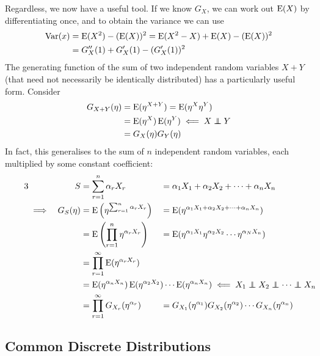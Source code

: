 Regardless, we now have a useful tool. If we know \(G_X\), we can work out
\(\operatorname{E}(X)\) by differentiating once, and to obtain the variance we can use
\begin{align*}
\operatorname{Var}(x) &= \operatorname{E}(X^2) - (\operatorname{E}(X))^2
    = \operatorname{E}(X^2 - X) + \operatorname{E}(X) - (\operatorname{E}(X))^2 \\
    &= G_X''(1) + G_X'(1) - (G_X'(1))^2
\end{align*}
The generating function of the sum of two independent random variables \(X + Y\)
(that need not necessarily be identically distributed) has a particularly useful
form. Consider
\begin{align*}
G_{X+Y}(\eta) &= \Expect(\eta^{X + Y}) = \Expect(\eta^X \eta^Y) \\
    &= \Expect(\eta^X) \Expect(\eta^Y) \impliedby X \independent Y \\
    &= G_X(\eta) G_Y(\eta)
\end{align*}
In fact, this generalises to the sum of \(n\) independent random variables, each
multiplied by some constant coefficient:
\begin{alignat*} 3
&& S &= \sum_{r = 1}^n \alpha_r X_r
    &&= \alpha_1 X_1 + \alpha_2 X_2 + \dotsb + \alpha_n X_n \\
&\implies& G_S(\eta) &= \Expect\pqty{\eta^{\sum_{r = 1}^n \alpha_r X_r}}
    &&= \Expect(\eta^{\alpha_1 X_1 + \alpha_2 X_2 + \dotsb + \alpha_n X_n}) \\
&& &= \Expect\pqty{\prod_{r = 1}^n \eta^{\alpha_r X_r}}
    &&= \Expect(\eta^{\alpha_1 X_1} \eta^{\alpha_2 X_2} \dotsm
              \eta^{\alpha_N X_n}) \\
&& &= \prod_{r = 1}^\infty\Expect(\eta^{\alpha_r X_r}) \\
&& &= \mathrlap{
        \Expect(\eta^{\alpha_n X_n}) \Expect(\eta^{\alpha_2 X_2}) \dotsm
        \Expect(\eta^{\alpha_n X_n})
            \impliedby X_1 \independent X_2 \independent
                             \dotsb \independent X_n} \\
&& &= \prod_{r = 1}^\infty G_{X_r}(\eta^{\alpha_r})
    &&= G_{X_1}(\eta^{\alpha_1}) G_{X_2}(\eta^{\alpha_2}) \dotsm
        G_{X_n}(\eta^{\alpha_n})
\end{alignat*}

\subsection{Common Discrete Distributions}

